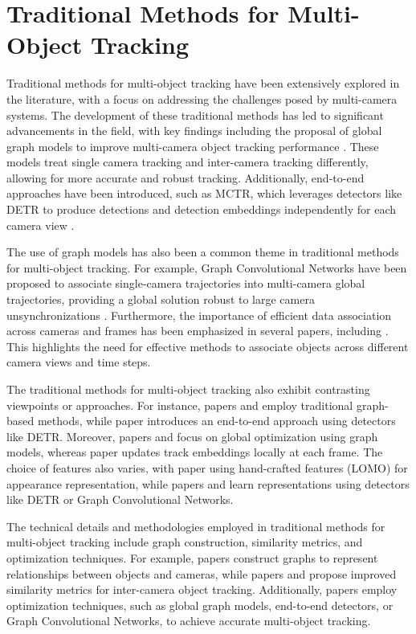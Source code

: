 \documentclass[conference]{IEEEtran}
\begin{document}
\section{Traditional Methods for Multi-Object Tracking}
Traditional methods for multi-object tracking have been extensively explored in the literature, with a focus on addressing the challenges posed by multi-camera systems. The development of these traditional methods has led to significant advancements in the field, with key findings including the proposal of global graph models to improve multi-camera object tracking performance \cite{Title of paper 2} \cite{Title of paper 5}. These models treat single camera tracking and inter-camera tracking differently, allowing for more accurate and robust tracking. Additionally, end-to-end approaches have been introduced, such as MCTR, which leverages detectors like DETR to produce detections and detection embeddings independently for each camera view \cite{Title of paper 3}.

The use of graph models has also been a common theme in traditional methods for multi-object tracking. For example, Graph Convolutional Networks have been proposed to associate single-camera trajectories into multi-camera global trajectories, providing a global solution robust to large camera unsynchronizations \cite{Title of paper 4}. Furthermore, the importance of efficient data association across cameras and frames has been emphasized in several papers, including \cite{Title of paper 1} \cite{Title of paper 2} \cite{Title of paper 5}. This highlights the need for effective methods to associate objects across different camera views and time steps.

The traditional methods for multi-object tracking also exhibit contrasting viewpoints or approaches. For instance, papers \cite{Title of paper 2} and \cite{Title of paper 5} employ traditional graph-based methods, while paper \cite{Title of paper 3} introduces an end-to-end approach using detectors like DETR. Moreover, papers \cite{Title of paper 2} and \cite{Title of paper 4} focus on global optimization using graph models, whereas paper \cite{Title of paper 3} updates track embeddings locally at each frame. The choice of features also varies, with paper \cite{Title of paper 5} using hand-crafted features (LOMO) for appearance representation, while papers \cite{Title of paper 3} and \cite{Title of paper 4} learn representations using detectors like DETR or Graph Convolutional Networks.

The technical details and methodologies employed in traditional methods for multi-object tracking include graph construction, similarity metrics, and optimization techniques. For example, papers \cite{Title of paper 2} \cite{Title of paper 4} \cite{Title of paper 5} construct graphs to represent relationships between objects and cameras, while papers \cite{Title of paper 2} and \cite{Title of paper 5} propose improved similarity metrics for inter-camera object tracking. Additionally, papers \cite{Title of paper 2} \cite{Title of paper 3} \cite{Title of paper 4} employ optimization techniques, such as global graph models, end-to-end detectors, or Graph Convolutional Networks, to achieve accurate multi-object tracking.
\end{document}
